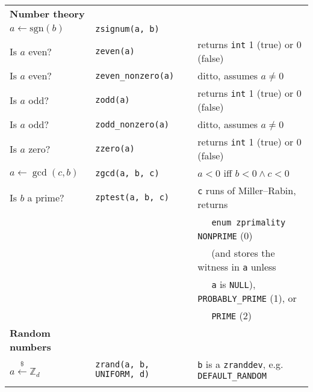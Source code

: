 \documentclass[10pt,draft]{article}
\begin{document}
\begin{tabular}{lll}
\textbf{Number theory}        & {}                         & {}                                                \\
$a \gets \mbox{sgn}(b)$       & {\tt zsignum(a, b)}        &                                                   \\
Is $a$ even?                  & {\tt zeven(a)}             & returns {\tt int} 1 (true) or 0 (false)           \\
Is $a$ even?                  & {\tt zeven\_nonzero(a)}    & ditto, assumes $a \neq 0$                         \\
Is $a$ odd?                   & {\tt zodd(a)}              & returns {\tt int} 1 (true) or 0 (false)           \\
Is $a$ odd?                   & {\tt zodd\_nonzero(a)}     & ditto, assumes $a \neq 0$                         \\
Is $a$ zero?                  & {\tt zzero(a)}             & returns {\tt int} 1 (true) or 0 (false)           \\
$a \gets \gcd(c, b)$          & {\tt zgcd(a, b, c)}        & $a < 0$ iff $b < 0 \wedge c < 0$                  \\
Is $b$ a prime?               & {\tt zptest(a, b, c)}      & {\tt c} runs of Miller--Rabin, returns            \\
{}                            & {}                         & $~~~~~$ {\tt enum zprimality} {\tt NONPRIME} (0)  \\
{}                            & {}                         & $~~~~~$ (and stores the witness in {\tt a} unless \\
{}                            & {}                         & $~~~~~$ {\tt a} is {\tt NULL}),
                                                                     {\tt PROBABLY\_PRIME} (1), or             \\
{}                            & {}                         & $~~~~~$ {\tt PRIME} (2)                           \\

\textbf{Random numbers}       & {}                         & {}                                                \\
$a \xleftarrow{\$} \mathbb{Z}_d $ & {\tt zrand(a, b, UNIFORM, d)}
& {\tt b} is a {\tt zranddev}, e.g. {\tt DEFAULT\_RANDOM} \\
\\


\end{tabular}
\end{document}
